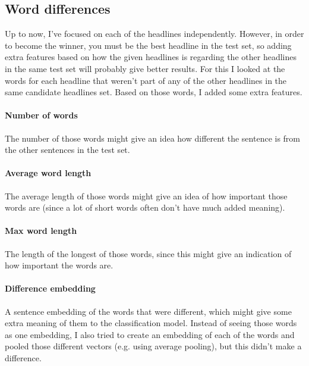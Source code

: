 \documentclass{article}
\begin{document}
\subsection{Word differences}
Up to now, I've focused on each of the headlines independently. However, in order to become the winner, you must be the best headline in the test set, so adding extra features based on how the given headlines is regarding the other headlines in the same test set will probably give better results. For this I looked at the words for each headline that weren't part of any of the other headlines in the same candidate headlines set. Based on those words, I added some extra features.

\paragraph{Number of words} The number of those words might give an idea how different the sentence is from the other sentences in the test set.

\paragraph{Average word length} The average length of those words might give an idea of how important those words are (since a lot of short words often don't have much added meaning).

\paragraph{Max word length} The length of the longest of those words, since this might give an indication of how important the words are.

\paragraph{Difference embedding} A sentence embedding of the words that were different, which might give some extra meaning of them to the classification model. Instead of seeing those words as one embedding, I also tried to create an embedding of each of the words and pooled those different vectors (e.g. using average pooling), but this didn't make a difference.
\end{document}
